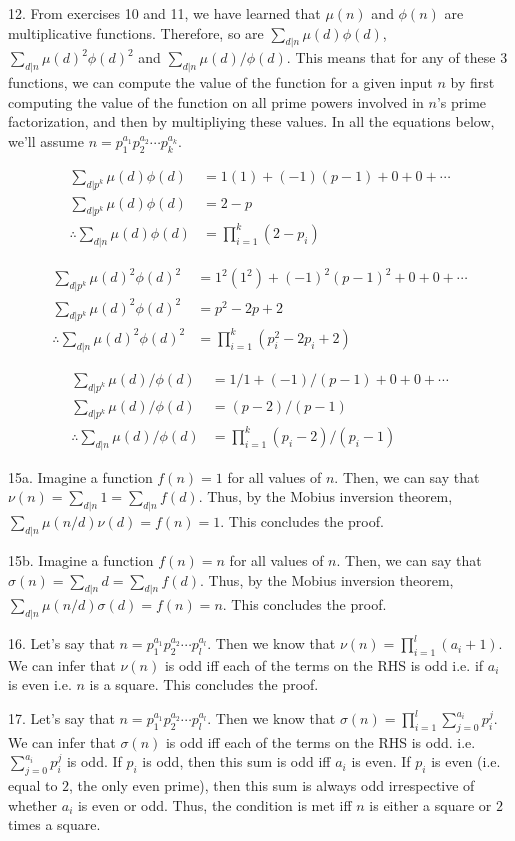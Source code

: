 \documentclass{article}
\begin{document}
12. From exercises 10 and 11, we have learned that $\mu(n)$ and $\phi(n)$ are multiplicative functions. Therefore, so are $\sum_{d | n} \mu(d) \phi(d)$, $\sum_{d | n} \mu(d)^2 \phi(d)^2$ and $\sum_{d | n} \mu(d) / \phi(d)$. This means that for any of these 3 functions, we can compute the value of the function for a given input $n$ by first computing the value of the function on all prime powers involved in $n$'s prime factorization, and then by multipliying these values. In all the equations below, we'll assume $n = p_1^{a_1} p_2^{a_2} \cdots p_k^{a_k}$.

\begin{align*}
    \sum_{d | p^k} \mu(d) \phi(d) &=  1(1) + (-1)(p - 1) + 0 + 0 + \cdots \\
    \sum_{d | p^k} \mu(d) \phi(d) &=  2 - p \\
    \therefore \sum_{d | n} \mu(d) \phi(d) &= \prod_{i = 1}^k (2 - p_i)
\end{align*}

\begin{align*}
    \sum_{d | p^k} \mu(d)^2 \phi(d)^2 &=  1^2(1^2) + (-1)^2(p - 1)^2 + 0 + 0 + \cdots \\
    \sum_{d | p^k} \mu(d)^2 \phi(d)^2 &=  p^2 - 2p + 2 \\
    \therefore \sum_{d | n} \mu(d)^2 \phi(d)^2 &= \prod_{i = 1}^k (p_i^2 -2p_i + 2)
\end{align*}

\begin{align*}
    \sum_{d | p^k} \mu(d) / \phi(d) &=  1 / 1 + (-1) / (p - 1) + 0 + 0 + \cdots \\
    \sum_{d | p^k} \mu(d) / \phi(d) &=  (p - 2) / (p - 1) \\
    \therefore \sum_{d | n} \mu(d) / \phi(d) &= \prod_{i = 1}^k (p_i - 2) / (p_i - 1)
\end{align*}

15a. Imagine a function $f(n) = 1$ for all values of $n$. Then, we can say that $\nu(n) = \sum_{d | n} 1 = \sum_{d | n} f(d)$. Thus, by the Mobius inversion theorem, $\sum_{d | n} \mu(n/d)\nu(d) = f(n) = 1$. This concludes the proof. 

15b. Imagine a function $f(n) = n$ for all values of $n$. Then, we can say that $\sigma(n) = \sum_{d | n} d = \sum_{d | n} f(d)$. Thus, by the Mobius inversion theorem, $\sum_{d | n} \mu(n/d)\sigma(d) = f(n) = n$. This concludes the proof.

16. Let's say that $n = p_1^{a_1} p_2^{a_2} \cdots p_l^{a_l}$. Then we know that $\nu(n) = \prod_{i = 1}^l (a_i + 1)$. We can infer that $\nu(n)$ is odd iff each of the terms on the RHS is odd i.e. if $a_i$ is even i.e. $n$ is a square. This concludes the proof.

17. Let's say that $n = p_1^{a_1} p_2^{a_2} \cdots p_l^{a_l}$. Then we know that $\sigma(n) = \prod_{i = 1}^l \sum_{j = 0}^{a_i} p_i^j$. We can infer that $\sigma(n)$ is odd iff each of the terms on the RHS is odd. i.e. $\sum_{j = 0}^{a_i} p_i^j$ is odd. If $p_i$ is odd, then this sum is odd iff $a_i$ is even. If $p_i$ is even (i.e. equal to $2$, the only even prime), then this sum is always odd irrespective of whether $a_i$ is even or odd. Thus, the condition is met iff $n$ is either a square or $2$ times a square. 
\end{document}
